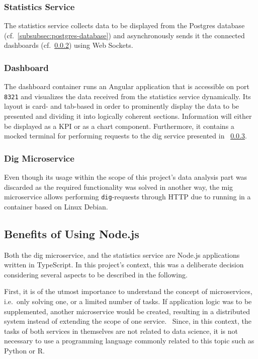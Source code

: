 \subsubsection{Statistics Service}\label{subsubsec:statistics-service}

The statistics service collects data to be displayed from the Postgres database (cf.~\ref{subsubsec:postgres-database}) and asynchronously sends it the connected dashboards (cf.~\ref{subsubsec:dashboard}) using Web Sockets.~\autocite[cf.][]{MDNWebDocs.2021}

\subsubsection{Dashboard}\label{subsubsec:dashboard}

The dashboard container runs an Angular application that is accessible on port \texttt{8321} and visualizes the data received from the statistics service dynamically.
Its layout is card- and tab-based in order to prominently display the data to be presented and dividing it into logically coherent sections.
Information will either be displayed as a KPI or as a chart component.
Furthermore, it contains a mocked terminal for performing requests to the dig service presented in ~\ref{subsubsec:dig-microservice}.

\subsubsection{Dig Microservice}\label{subsubsec:dig-microservice}

Even though its usage within the scope of this project's data analysis part was discarded as the required functionality was solved in another way, the mig microservice allows performing \texttt{dig}-requests through HTTP due to running in a container based on Linux Debian.

\subsection{Benefits of Using Node.js}\label{subsec:choosing-a-node-based-environment}

Both the dig microservice, and the statistics service are Node.js applications written in TypeScript.
In this project's context, this was a deliberate decision considering several aspects to be described in the following.

First, it is of the utmost importance to understand the concept of microservices, i.e.\ only solving one, or a limited number of tasks.
If application logic was to be supplemented, another microservice would be created, resulting in a distributed system instead of extending the scope of one service.~\autocite[cf.][p. 23]{Farcic.2016}
Since, in this context, the tasks of both services in themselves are not related to data science, it is not necessary to use a programming language commonly related to this topic such as Python or R.~\autocite[cf.][]{Gossett.2021}

